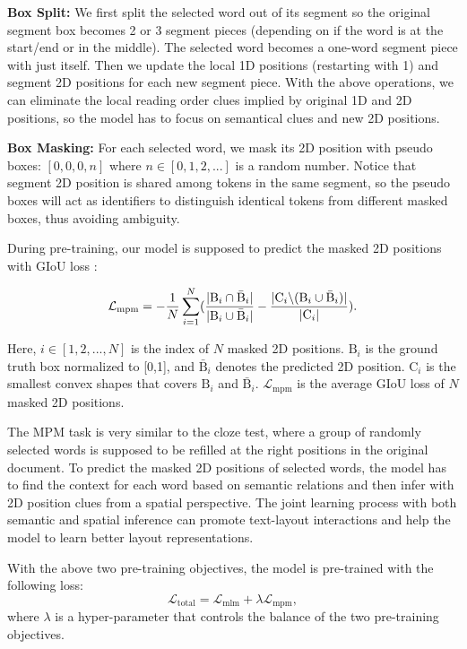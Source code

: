 \documentclass[11pt]{article}
\begin{document}
\noindent\textbf{Box Split:}
We first split the selected word out of its segment so the original segment box becomes 2 or 3 segment
pieces (depending on if the word is at the start/end or in the middle).
The selected word becomes a one-word segment piece with just itself.
Then we update the local 1D positions (restarting with 1) and segment 2D positions for each new segment piece.
With the above operations, we can eliminate the local reading order clues implied by original 1D and 2D positions, so the model has to focus on semantical clues and new 2D positions.

\noindent\textbf{Box Masking:}
For each selected word, we mask its 2D position with pseudo boxes: $[0,0,0,n]$ where $n\in [0,1,2,...]$ is a random number.
Notice that segment 2D position is shared among tokens in the same segment, so the pseudo boxes will act as identifiers to distinguish identical tokens from different masked boxes, thus avoiding ambiguity.  

During pre-training, our model is supposed to predict the masked 2D positions with GIoU loss \citep{rezatofighi2019generalized}:


\begin{equation}
\label{equ:mpm}
\small
\mathcal{L}_\mathrm{mpm}= 
- \frac{1}{N}
 \sum_{i=1}^{N} 
(\frac{|\mathrm{B}_{i} \cap \mathrm{\bar{B}}_{i}|}{|\mathrm{B}_{i} \cup \mathrm{\bar{B}}_{i}|}-
\frac{|\mathrm{C}_i \backslash(\mathrm{B}_{i} \cup \mathrm{\bar{B}}_{i})|}{|\mathrm{C}_i|}).
\end{equation}

Here, $i\in[1,2,...,N]$ is the index of $N$ masked 2D positions.
$\mathrm{B}_{i}$ is the ground truth box normalized to [0,1], and $\mathrm{\bar{B}}_{i}$ denotes the predicted 2D position.
$\mathrm{C}_i$ is the smallest convex shapes that covers $\mathrm{B}_{i}$ and $\mathrm{\bar{B}}_{i}$. $\mathcal{L}_\mathrm{mpm} $ is the average GIoU loss of $N$ masked 2D positions.


The MPM task is very similar to the cloze test, where a group of randomly selected words is supposed to be refilled at the right positions in the original document. 
To predict the masked 2D positions of selected words, the model has to find the context for each word based on semantic relations and then infer with 2D position clues from a spatial perspective. The joint learning process with both semantic and spatial inference can promote text-layout interactions and help the model to learn better layout representations.


With the above two pre-training objectives, the model is pre-trained with the following loss:
\begin{equation}
\label{equ:total}
\mathcal{L}_\mathrm{total}= \mathcal{L}_\mathrm{mlm}+\lambda\mathcal{L}_\mathrm{mpm},
\end{equation}
where $\lambda$ is a hyper-parameter that controls the balance of the two pre-training objectives. 
\end{document}
